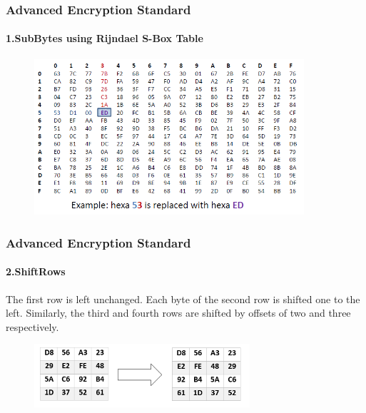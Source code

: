 \begin{frame}
	\frametitle{Advanced Encryption Standard}
		\framesubtitle{1.SubBytes using Rijndael S-Box Table}
	\vspace{0.5cm}
		\begin{figure}
		\centering
		\includegraphics[width=10cm]{sbox}
		\label{fig:obrazek sbox}
	\end{figure}
\end{frame}

\begin{frame}
	\frametitle{Advanced Encryption Standard}
		\framesubtitle{2.ShiftRows}
	\vfill
	\vspace{-0.5cm}
	\begin{block}{}
\footnotesize {The first row is left unchanged. Each byte of the second row is shifted one to the left. Similarly, the third and fourth rows are shifted by offsets of two and three respectively.}
	\end{block}
		\begin{figure}
		\centering
		\includegraphics[width=8cm]{shiftrows}
		\label{fig:obrazek sbox}
	\end{figure}
\end{frame}

